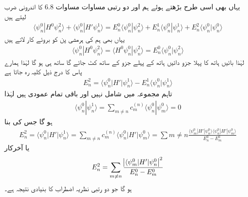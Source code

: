 
یہاں بھی اسی طرح بڑھتے ہوئے ہم  اور دو رتبی مساوات مساوات 6.8 کا اندرونی ضرب لیتے ہیں 
\begin{align*}
\langle \psi_n^0 | H^0 \psi_n^2 \rangle + \langle \psi_n^0 | H' \psi_n^1 \rangle = E_n^0 \langle \psi_n^0 | \psi_n^2 \rangle + E_n^1 \langle \psi_n^0 | \psi_n^1 \rangle + E_n^2 \langle \psi_n^0 | \psi_n^0 \rangle
\end{align*}
یہاں بھی ہم  کی ہرمشی پن کو بروئے کار لاتے ہیں 
\begin{align*}
\langle \psi_n^0 | H^0 \psi_n^2 \rangle = \langle H^0 \psi_n^0 | \psi_n^2 \rangle = E_n^0 \langle \psi_n^0 | \psi_n^2 \rangle
\end{align*}
 لہٰذا  بائیں ہاتھ کا پہلا جزو دائیں ہاتھ کے پہلے جزو کے ساتھ کٹ جائے گا   ساتھ   ہی  ہو گا   لہٰذا  ہمارے پاس  کا درج ذیل  کلیہ رہ جاتا ہے 
\begin{align}
E_n^2 = \langle \psi_n^0 | H' | \psi_n^1 \rangle - E_n^1 \langle \psi_n^0 | \psi_n^1 \rangle
\end{align}
تاہم  مجموعہ  میں  شامل نہیں  اور  باقی تمام عمودی ہیں  لہٰذا  
\begin{align*}
\langle \psi_n^0 | \psi_n^1 \rangle  = \sum_{m \ne n} c_m^{(n)} \langle \psi_n^0 | \psi_m^0 \rangle = 0
\end{align*}
 ہو گا جس کی بنا 
\begin{align*}
E_n^2 = \langle \psi_n^0 | H' | \psi_n^1 \rangle = \sum_{m \ne n} c_m^{(n)} \langle \psi_n^0 | H' | \psi_m^0 \rangle = \sum{m \ne n} \frac{\langle \psi_m^0 | H' | \psi_n^0 \rangle \langle \psi_n^0 | H' | \psi_m^0 \rangle }{E_n^0 - E_m^0}
\end{align*}
یا  آخرکار
\begin{align}
E_n^2 = \sum_{m \ne n} \frac{ \abs{ \langle \psi_m^0 | H' | \psi_n^0 }^2 }{E_n^0 - E_m^0}
\end{align}
 ہو گا جو دو رتبی نظریہ اضطراب کا بنیادی نتیجہ ہے۔

